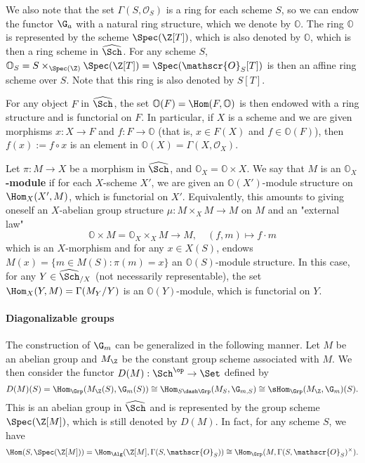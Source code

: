 We also note that the set $\Gamma(S,\mathscr{O}_S)$ is a ring for each scheme $S$, so we can endow the functor $\G_a$ with a natural ring structure, which we denote by $\mathbb{O}$. The ring $\mathbb{O}$ is represented by the scheme $\Spec(\Z[T])$, which is also denoted by $\mathbb{O}$, which is then a ring scheme in $\widehat{\Sch}$. For any scheme $S$, $\mathbb{O}_S=S\times_{\Spec(\Z)}\Spec(\Z[T])=\Spec(\mathscr{O}_S[T])$ is then an affine ring scheme over $S$. Note that this ring is also denoted by $S[T]$.\par
For any object $F$ in $\widehat{\Sch}$, the set $\mathbb{O}(F)=\Hom(F,\mathbb{O})$ is then endowed with a ring structure and is functorial on $F$. In particular, if $X$ is a scheme and we are given morphisms $x:X\to F$ and $f:F\to\mathbb{O}$ (that is, $x\in F(X)$ and $f\in\mathbb{O}(F)$), then $f(x):=f\circ x$ is an element in $\mathbb{O}(X)=\Gamma(X,\mathscr{O}_X)$.

\begin{definition}
Let $\pi:M\to X$ be a morphism in $\widehat{\Sch}$, and $\mathbb{O}_X=\mathbb{O}\times X$. We say that $M$ is an \textbf{$\mathbb{O}_X$-module} if for each $X$-scheme $X'$, we are given an $\mathbb{O}(X')$-module structure on $\Hom_X(X',M)$, which is functorial on $X'$. Equivalently, this amounts to giving oneself an $X$-abelian group structure $\mu:M\times_XM\to M$ on $M$ and an "external law"
\[\mathbb{O}\times M=\mathbb{O}_X\times_XM\to M,\quad (f,m)\mapsto f\cdot m\]
which is an $X$-morphism and for any $x\in X(S)$, endows $M(x)=\{m\in M(S):\pi(m)=x\}$ an $\mathbb{O}(S)$-module structure. In this case, for any $Y\in\widehat{\Sch}_{/X}$ (not necessarily representable), the set $\Hom_X(Y,M)=\Gamma(M_Y/Y)$ is an $\mathbb{O}(Y)$-module, which is functorial on $Y$.
\end{definition}

\paragraph{Diagonalizable groups}
The construction of $\G_m$ can be generalized in the following manner. Let $M$ be an abelian group and $M_\Z$ be the constant group scheme associated with $M$. We then consider the functor $D(M):\Sch^{\op}\to\Set$ defined by
\[D(M)(S)=\Hom_{\Grp}(M_\Z(S),\G_m(S))\cong \Hom_{S\dash\Grp}(M_S,\G_{m,S})\cong \sHom_{\Grp}(M_\Z,\G_m)(S).\]
This is an abelian group in $\widehat{\Sch}$ and is represented by the group scheme $\Spec(\Z[M])$, which is still denoted by $D(M)$. In fact, for any scheme $S$, we have
\[\Hom(S,\Spec(\Z[M]))=\Hom_{\Alg}(\Z[M],\Gamma(S,\mathscr{O}_S))\cong\Hom_{\Grp}(M,\Gamma(S,\mathscr{O}_S)^{\times}).\]

